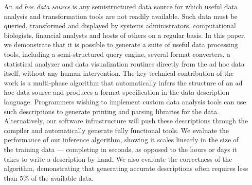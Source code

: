 An {\em ad hoc data source} is any semistructured data source for
which useful data analysis and transformation tools are not 
readily available.  Such data must be queried, transformed and displayed by
systems administrators, computational biologists, financial analysts
and hosts of others on a regular basis.  
In this paper, we demonstrate that it is possible to generate a suite
of useful data processing tools, including a semi-structured query
engine, several format converters, a statistical analyzer and data
visualization routines directly from the ad hoc data itself, 
without any human intervention.  
The key technical contribution of the work is a multi-phase algorithm
that automatically infers the structure of an ad hoc data source and
produces a format specification in the \pads{} data description
language.  
Programmers wishing to implement custom data analysis tools
can use such descriptions to generate printing and parsing libraries
for the data.  Alternatively,  our software infrastructure will
push these descriptions through the \pads{} compiler and automatically
generate fully functional tools.  We evaluate the performance of
our inference algorithm, showing it scales linearly
in the size of the training data --- completing in seconds, as opposed
to the hours or days it takes to write a description by hand.
We also evaluate the correctness of the algorithm, demonstrating that 
generating accurate descriptions often requires less than 5\% of the
available data.